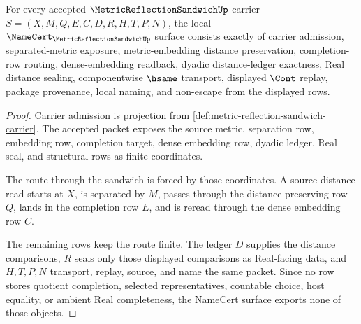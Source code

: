 \begin{theorem}
\label{thm:metric-reflection-sandwich-namecert-obligations}
For every accepted $\MetricReflectionSandwichUp$ carrier $S=(X,M,Q,E,C,D,R,H,T,P,N)$, the local $\NameCert_{\MetricReflectionSandwichUp}$ surface consists exactly of carrier admission, separated-metric exposure, metric-embedding distance preservation, completion-row routing, dense-embedding readback, dyadic distance-ledger exactness, Real distance sealing, componentwise $\hsame$ transport, displayed $\Cont$ replay, package provenance, local naming, and non-escape from the displayed rows.
\end{theorem}
\begin{proof}
Carrier admission is projection from \autoref{def:metric-reflection-sandwich-carrier}. The accepted packet exposes the source metric, separation row, embedding row, completion target, dense embedding row, dyadic ledger, Real seal, and structural rows as finite coordinates.

The route through the sandwich is forced by those coordinates. A source-distance read starts at $X$, is separated by $M$, passes through the distance-preserving row $Q$, lands in the completion row $E$, and is reread through the dense embedding row $C$.

The remaining rows keep the route finite. The ledger $D$ supplies the distance comparisons, $R$ seals only those displayed comparisons as Real-facing data, and $H,T,P,N$ transport, replay, source, and name the same packet. Since no row stores quotient completion, selected representatives, countable choice, host equality, or ambient Real completeness, the NameCert surface exports none of those objects.
\end{proof}

